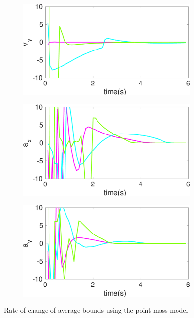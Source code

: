 \begin{figure}[!h]
\begin{subfigure}{.5\linewidth}
\end{subfigure}
\begin{subfigure}{.5\linewidth}
\centering
\includegraphics[width=\linewidth]{figures/BoundChange/PM/pm_bound_changev_y}
\end{subfigure}
\begin{subfigure}{.5\linewidth}
\centering
\includegraphics[width=\linewidth]{figures/BoundChange/PM/pm_bound_changea_x}
\end{subfigure}
\begin{subfigure}{.5\linewidth}
\centering
\includegraphics[width=\linewidth]{figures/BoundChange/PM/pm_bound_changea_y}
\end{subfigure}
\caption{Rate of change of average bounds using the point-mass model}
\end{figure}
\pagebreak
